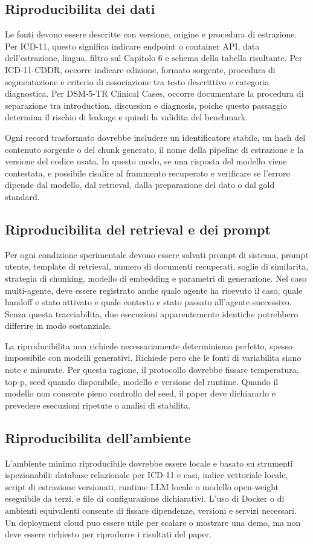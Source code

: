 \documentclass[11pt,a4paper]{article}
\begin{document}
\subsection{Riproducibilita dei dati}
Le fonti devono essere descritte con versione, origine e procedura di estrazione. Per ICD-11, questo significa indicare endpoint o container API, data dell'estrazione, lingua, filtro sul Capitolo 6 e schema della tabella risultante. Per ICD-11-CDDR, occorre indicare edizione, formato sorgente, procedura di segmentazione e criterio di associazione tra testo descrittivo e categoria diagnostica. Per DSM-5-TR Clinical Cases, occorre documentare la procedura di separazione tra introduction, discussion e diagnosis, poiche questo passaggio determina il rischio di leakage e quindi la validita del benchmark.

Ogni record trasformato dovrebbe includere un identificatore stabile, un hash del contenuto sorgente o del chunk generato, il nome della pipeline di estrazione e la versione del codice usata. In questo modo, se una risposta del modello viene contestata, e possibile risalire al frammento recuperato e verificare se l'errore dipende dal modello, dal retrieval, dalla preparazione del dato o dal gold standard.

\subsection{Riproducibilita del retrieval e dei prompt}
Per ogni condizione sperimentale devono essere salvati prompt di sistema, prompt utente, template di retrieval, numero di documenti recuperati, soglie di similarita, strategia di chunking, modello di embedding e parametri di generazione. Nel caso multi-agente, deve essere registrato anche quale agente ha ricevuto il caso, quale handoff e stato attivato e quale contesto e stato passato all'agente successivo. Senza questa tracciabilita, due esecuzioni apparentemente identiche potrebbero differire in modo sostanziale.

La riproducibilita non richiede necessariamente determinismo perfetto, spesso impossibile con modelli generativi. Richiede pero che le fonti di variabilita siano note e misurate. Per questa ragione, il protocollo dovrebbe fissare temperatura, top-p, seed quando disponibile, modello e versione del runtime. Quando il modello non consente pieno controllo del seed, il paper deve dichiararlo e prevedere esecuzioni ripetute o analisi di stabilita.

\subsection{Riproducibilita dell'ambiente}
L'ambiente minimo riproducibile dovrebbe essere locale e basato su strumenti ispezionabili: database relazionale per ICD-11 e casi, indice vettoriale locale, script di estrazione versionati, runtime LLM locale o modello open-weight eseguibile da terzi, e file di configurazione dichiarativi. L'uso di Docker o di ambienti equivalenti consente di fissare dipendenze, versioni e servizi necessari. Un deployment cloud puo essere utile per scalare o mostrare una demo, ma non deve essere richiesto per riprodurre i risultati del paper.
\end{document}
